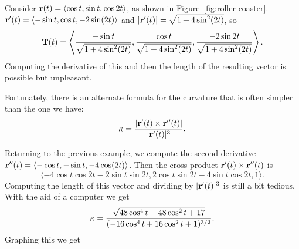\begin{example}{}{}
Consider ${\bf r}(t)=
\langle \cos t,\sin
t,\cos 2t\rangle$, as shown in Figure~\ref{fig:roller coaster}.
${\bf r}'(t)=
\langle -\sin t,\cos
t,-2\sin (2t)\rangle$ and $|{\bf r}'(t)|=
\sqrt{1+4\sin^2(2t)}$, so 
$${\bf T}(t)=\left\langle {-\sin t\over \sqrt{1+4\sin^2(2t)}},
{\cos t\over \sqrt{1+4\sin^2(2t)}},
{-2\sin 2t\over \sqrt{1+4\sin^2(2t)}}\right\rangle.$$
Computing the derivative of this and then the length of the resulting
vector is possible but unpleasant.
\end{example}

Fortunately, there is an alternate formula for the
curvature that is often simpler than the one we have:
$$\kappa = {|{\bf r}'(t)\times{\bf r}''(t)|\over|{\bf r}'(t)|^3}.$$

\begin{example}{}{}
Returning to the previous example, we compute the second derivative
${\bf r}''(t)=
\langle -\cos t,-\sin t,-4\cos(2t)\rangle$. Then the cross product 
${\bf r}'(t)\times{\bf r}''(t)$ is 
$$\langle -4\cos t\cos 2t-2\sin t\sin 2t,
2\cos t\sin 2t-4\sin t \cos2t,1\rangle.$$ Computing the length of this
vector and dividing by $|{\bf r}'(t)|^3$ is still a bit tedious.
With the aid of a computer we get
$$\kappa = {\sqrt{48\cos^4 t - 48\cos^2 t + 17}\over
(-16\cos^4 t +16\cos^2t+1)^{3/2}}.$$
Graphing this we get


\end{example}
